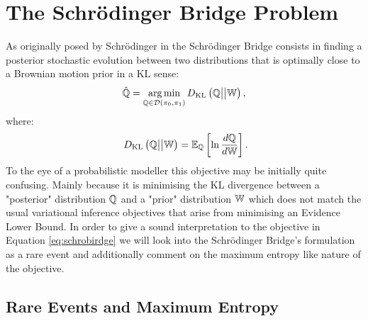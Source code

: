 \documentclass[a4paper,12pt,twoside,openright]{report}
\theoremstyle{definition}
\begin{document}
\chapter{The Schrödinger Bridge Problem}

As originally posed by Schrödinger in \citep{schrodinger1931uber, schrodinger1932theorie} the Schrödinger Bridge consists in finding a posterior stochastic evolution between two distributions that is optimally close to a Brownian motion prior in a KL sense:
\begin{align} \label{eq:schrobirdge}
    \hat{{\mathbb{Q}}}= \operatorname*{arg\,min}_{{\mathbb{Q}} \in {\mathcal{D}}(\pi_0, \pi_1)} D_{\mathrm{KL}}\left({\mathbb{Q}} \big|\big| \mathbb{W}\right),
\end{align}
where:
\begin{align} \label{eq:schrobirdge}
    \ D_{\mathrm{KL}}\left({\mathbb{Q}} \big|\big| \mathbb{W}\right) = \mathbb{E}_{{\mathbb{Q}}}\left[\ln \frac{d{\mathbb{Q}}}{d\mathbb{W}}\right].
\end{align}
To the eye of a probabilistic modeller this objective may be initially quite confusing.  Mainly because it is minimising the KL divergence between a "posterior" distribution ${\mathbb{Q}}$ and a "prior" distribution $\mathbb{W}$ which does not match the usual variational inference objectives that arise from minimising an Evidence Lower Bound. In order to give a sound interpretation to the objective in Equation \ref{eq:schrobirdge} we will look into the Schrödinger Bridge's formulation as a rare event and additionally comment on the maximum entropy like nature of the objective.

\section{Rare Events and Maximum Entropy }
\end{document}
